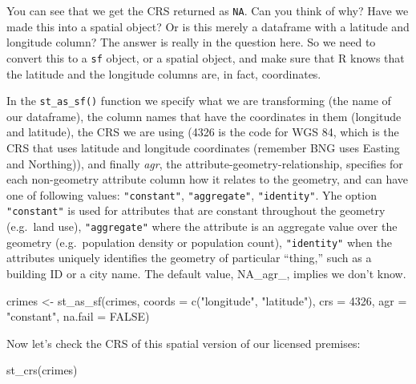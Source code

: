 \documentclass[
]{book}
\newenvironment{Shaded}{\begin{snugshade}}{\end{snugshade}}
\newcommand{\AttributeTok}[1]{\textcolor[rgb]{0.77,0.63,0.00}{#1}}
\newcommand{\ConstantTok}[1]{\textcolor[rgb]{0.00,0.00,0.00}{#1}}
\newcommand{\DecValTok}[1]{\textcolor[rgb]{0.00,0.00,0.81}{#1}}
\newcommand{\FunctionTok}[1]{\textcolor[rgb]{0.00,0.00,0.00}{#1}}
\newcommand{\NormalTok}[1]{#1}
\newcommand{\OtherTok}[1]{\textcolor[rgb]{0.56,0.35,0.01}{#1}}
\newcommand{\StringTok}[1]{\textcolor[rgb]{0.31,0.60,0.02}{#1}}
\begin{document}
You can see that we get the CRS returned as \texttt{NA}. Can you think of why? Have we made this into a spatial object? Or is this merely a dataframe with a latitude and longitude column? The answer is really in the question here. So we need to convert this to a \texttt{sf} object, or a spatial object, and make sure that R knows that the latitude and the longitude columns are, in fact, coordinates.

In the \texttt{st\_as\_sf()} function we specify what we are transforming (the name of our dataframe), the column names that have the coordinates in them (longitude and latitude), the CRS we are using (4326 is the code for WGS 84, which is the CRS that uses latitude and longitude coordinates (remember BNG uses Easting and Northing)), and finally \emph{agr}, the attribute-geometry-relationship, specifies for each non-geometry attribute column how it relates to the geometry, and can have one of following values: \texttt{"constant"}, \texttt{"aggregate"}, \texttt{"identity"}. Yhe option \texttt{"constant"} is used for attributes that are constant throughout the geometry (e.g.~land use), \texttt{"aggregate"} where the attribute is an aggregate value over the geometry (e.g.~population density or population count), \texttt{"identity"} when the attributes uniquely identifies the geometry of particular ``thing,'' such as a building ID or a city name. The default value, NA\_agr\_, implies we don't know.

\begin{Shaded}
\begin{Highlighting}[]
\NormalTok{crimes }\OtherTok{\textless{}{-}} \FunctionTok{st\_as\_sf}\NormalTok{(crimes, }\AttributeTok{coords =} \FunctionTok{c}\NormalTok{(}\StringTok{"longitude"}\NormalTok{, }\StringTok{"latitude"}\NormalTok{), }
                 \AttributeTok{crs =} \DecValTok{4326}\NormalTok{, }\AttributeTok{agr =} \StringTok{"constant"}\NormalTok{, }\AttributeTok{na.fail =} \ConstantTok{FALSE}\NormalTok{)}
\end{Highlighting}
\end{Shaded}

Now let's check the CRS of this spatial version of our licensed premises:

\begin{Shaded}
\begin{Highlighting}[]
\FunctionTok{st\_crs}\NormalTok{(crimes)}
\end{Highlighting}
\end{Shaded}
\end{document}
